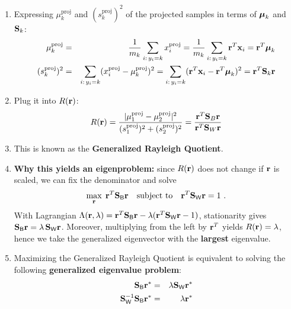 \begin{enumerate}
		\item Expressing $\mu_k^{\mathrm{proj}}$ and $(s_k^{\mathrm{proj}})^2$ of the projected samples in terms of $\bm{\mathrm{\mu}}_k$ and $\mathbf{S}_k$:
		      {\small
		      \begin{eqnarray*}
			          \mu_k^{\mathrm{proj}} &=&
				         \frac{1}{m_k} \sum_{i:\, y_i = k} x_i^{\mathrm{proj}} 
				       = \frac{1}{m_k} \sum_{i:\, y_i = k} \bm{\mathrm{r}}^T  \bm{\mathrm{x}}_i 
				       = \bm{\mathrm{r}}^T \bm{\mathrm{\mu}}_k  \\
				      (s_k^{\mathrm{proj}})^2 &=&
				        \sum_{i:\, y_i = k} (x_i^{\mathrm{proj}} - \mu_k^{\mathrm{proj}})^2 
				      = \sum_{i:\, y_i = k} (\bm{\mathrm{r}}^T \bm{\mathrm{x}}_i - \bm{\mathrm{r}}^T \bm{\mathrm{\mu}}_k)^2 
				      = \bm{\mathrm{r}}^T \mathbf{S}_k \bm{\mathrm{r}} 
		      \end{eqnarray*}
		      }
		\item Plug it into $R(\bm{\mathrm{r}})$:
		      {\small
		      \begin{displaymath}
			      R(\bm{\mathrm{r}})
			      = \frac{|\mu_1^{\mathrm{proj}} - \mu_2^{\mathrm{proj}}|^2}{(s_1^{\mathrm{proj}})^2 + (s_2^{\mathrm{proj}})^2}
			      = \frac{\bm{\mathrm{r}}^T \mathbf{S}_B \bm{\mathrm{r}}}{\bm{\mathrm{r}}^T \mathbf{S}_W \bm{\mathrm{r}}}
			      \end{displaymath}
		      }
		\item[] This is known as the \textbf{Generalized Rayleigh Quotient}.
		\item \textbf{Why this yields an eigenproblem:} since $R(\bm{\mathrm{r}})$ does not change if $\bm{\mathrm{r}}$ is scaled, we can fix the denominator and solve
		      {\small
		      \[
		        \max_{\bm{\mathrm{r}}}\; \bm{\mathrm{r}}^T\mathbf{S}_\mathsf B\bm{\mathrm{r}}
		        \quad\text{subject to}\quad \bm{\mathrm{r}}^T\mathbf{S}_\mathsf W\bm{\mathrm{r}} = 1~.
		      \]
		      }
		      With Lagrangian $\Lambda(\bm{\mathrm{r}},\lambda)=\bm{\mathrm{r}}^T\mathbf{S}_\mathsf B\bm{\mathrm{r}}-\lambda(\bm{\mathrm{r}}^T\mathbf{S}_\mathsf W\bm{\mathrm{r}}-1)$, stationarity gives
		      $\mathbf{S}_\mathsf B\bm{\mathrm{r}} = \lambda\,\mathbf{S}_\mathsf W\bm{\mathrm{r}}$.
		      Moreover, multiplying from the left by $\bm{\mathrm{r}}^T$ yields $R(\bm{\mathrm{r}})=\lambda$, hence we take the generalized eigenvector with the \textbf{largest} eigenvalue.
		\item Maximizing the Generalized Rayleigh Quotient is equivalent to solving the following \textbf{generalized eigenvalue problem}:
		      {\small
		      \begin{eqnarray*}
			      \mat{S}_\mathsf{B} \vect{r}^* &=& \lambda \mat{S}_\mathsf{W} \vect{r}^* \\
			      \mat{S}_\mathsf{W}^{-1} \mat{S}_\mathsf{B} \vect{r}^* &=& \lambda \vect{r}^* \\

\end{eqnarray*}}
\end{enumerate}
